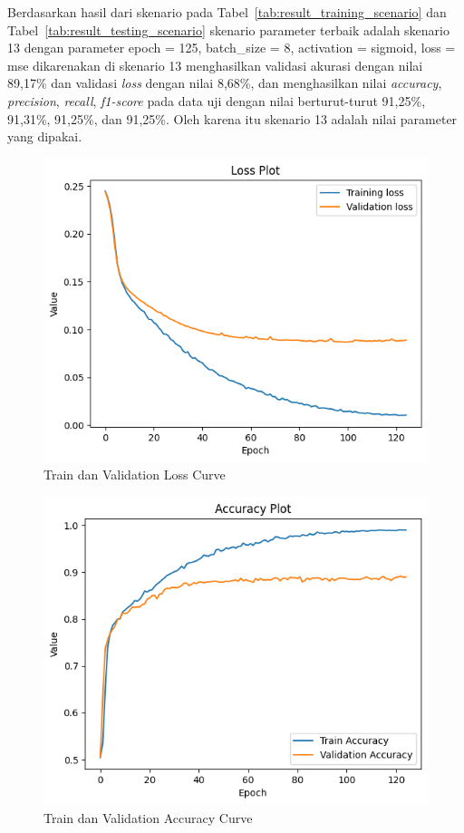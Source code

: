 Berdasarkan hasil dari skenario pada Tabel~\ref{tab:result_training_scenario} dan
Tabel~\ref{tab:result_testing_scenario} skenario parameter terbaik adalah skenario 13 dengan
parameter epoch = 125, batch\_size = 8, activation = sigmoid, loss = mse dikarenakan di skenario 13
menghasilkan validasi akurasi dengan nilai 89,17\% dan validasi \emph{loss} dengan nilai 8,68\%,
dan menghasilkan nilai \emph{accuracy}, \emph{precision}, \emph{recall}, \emph{f1-score} pada data uji
dengan nilai berturut-turut 91,25\%, 91,31\%, 91,25\%, dan 91,25\%. Oleh karena itu skenario 13 adalah
nilai parameter yang dipakai.

\begin{figure}[H]
  \centering
  \includegraphics[scale=0.59]{assets/train_validation_loss.png}
  \caption{Train dan Validation Loss Curve}
  \label{fig:train_val_loss_cnn}
\end{figure}

\begin{figure}[H]
  \centering
  \includegraphics[scale=0.65]{assets/train_validation_accuracy.png}
  \caption{Train dan Validation Accuracy Curve}
  \label{fig:train_val_accuracy_cnn}
\end{figure}

